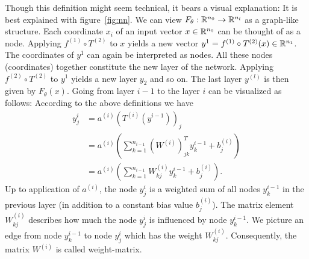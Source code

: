 Though this definition might seem technical, it bears a visual explanation:
It is best explained with figure~\ref{fig:nn}. We can view $F_\theta:\mathbb{R}^{n_0}\to\mathbb{R}^{n_l}$ as a graph-like structure. Each coordinate $x_i$ 
of an input vector $x\in\mathbb{R}^{n_0}$ can be thought of as a node. Applying $f^{(1)}\circ T^{(2)}$ to $x$ yields a
new vector $y^1=f^{(1)}\circ T^{(2)}(x)\in\mathbb{R}^{n_1}$. The coordinates of $y^1$ can again be interpreted as nodes. All these nodes (coordinates) together constitute the new layer
of the network. Applying $f^{(2)}\circ T^{(2)}$ to $y^1$ yields a new layer $y_2$ and so on. The last layer $y^{(l)}$ is then given by $F_\theta(x)$.
Going from layer $i-1$ to the layer $i$ can be visualized as follows: 
According to the above definitions we have
\begin{align*}
    y^{i}_j&=a^{(i)}\left(T^{(i)}\left(y^{i-1}\right)\right)_j\\
    &=a^{(i)}\left(\sum_{k=1}^{n_{i-1}}\left(W^{(i)}\right)^T_{jk}y^{i-1}_k+b^{(i)}_j\right)\\
    &=a^{(i)}\left(\sum_{k=1}^{n_{i-1}}W^{(i)}_{kj}y^{i-1}_k+b^{(i)}_j\right).
\end{align*}
Up to application of $a^{(i)}$, the node $y^i_j$ is a weighted sum of all nodes $y^{i-1}_k$ in the previous layer (in addition to a constant bias value $b^{(i)}_j$).
The matrix element $W^{(i)}_{kj}$ describes how much the node $y^i_j$ is influenced by node $y^{i-1}_k$. 
We picture an edge from node $y^{i-1}_k$ to node $y^i_j$ which has the weight $W^{(i)}_{kj}$. Consequently, the matrix $W^{(i)}$ is called weight-matrix.
